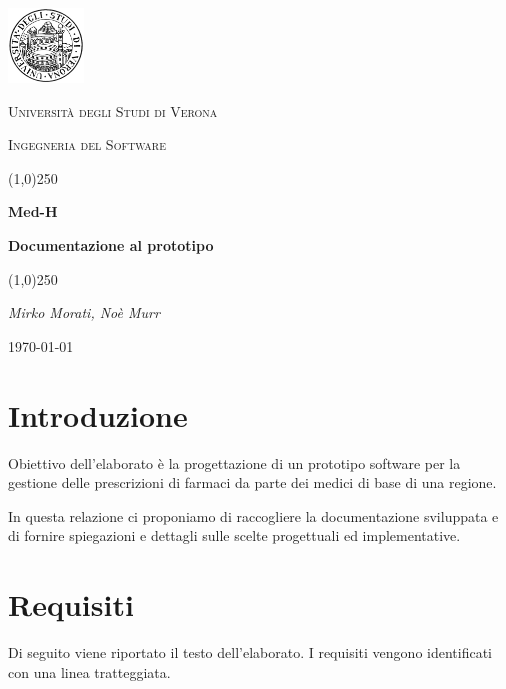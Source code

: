 \documentclass[a4paper, 11pt]{article}
\begin{document}
	\clearpage
\begin{titlepage}
	\centering
	\vspace*{\fill}
	\includegraphics[width=0.15\textwidth]{logo.png}\par\vspace{1cm}
	{\scshape\LARGE Università degli Studi di Verona \par}
	\vspace{1cm}
	{\scshape\Large Ingegneria del Software\par}
	\vspace{1.5cm}
	\line(1,0){250} \\
	{\huge\bfseries Med-H\par}
	{\Large\bfseries Documentazione al prototipo\par}
	\line(1,0){250} \\
	\vspace{2cm}
	{\Large\itshape Mirko Morati, Noè Murr\par}
	\vspace{5cm}
	\vspace*{\fill}
	{\large \today\par}
\end{titlepage}
\thispagestyle{empty}
\newpage
\tableofcontents
\newpage

\section{Introduzione}
Obiettivo dell'elaborato è la progettazione di un prototipo software per la gestione delle prescrizioni di farmaci da parte dei medici di base di una regione.

In questa relazione ci proponiamo di raccogliere la documentazione sviluppata e di fornire spiegazioni e dettagli sulle scelte progettuali ed implementative. 

\section{Requisiti}
Di seguito viene riportato il testo dell'elaborato. I requisiti vengono identificati con una linea tratteggiata.
\end{document}

